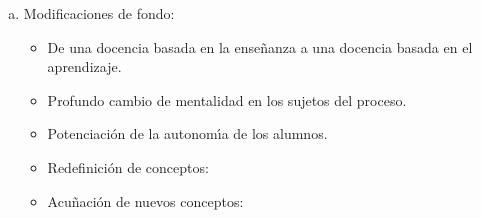 \begin{enumerate}[a)]
\item Modificaciones de fondo:

\begin{itemize}
\item De una docencia basada en la ense\~{n}anza a una docencia basada
en el aprendizaje.
\item Profundo cambio de mentalidad en los sujetos del proceso.
\item Potenciaci\'{o}n de la autonom\'{\i}a de los alumnos.
\item 
\begin{minipage}{0.35\linewidth}
{Redefinici\'{o}n de conceptos:}
\end{minipage}

\item 
\begin{minipage}{0.45\linewidth}
{Acu\~{n}aci\'{o}n de nuevos conceptos:}
\end{minipage}


\end{itemize}
\end{enumerate}
